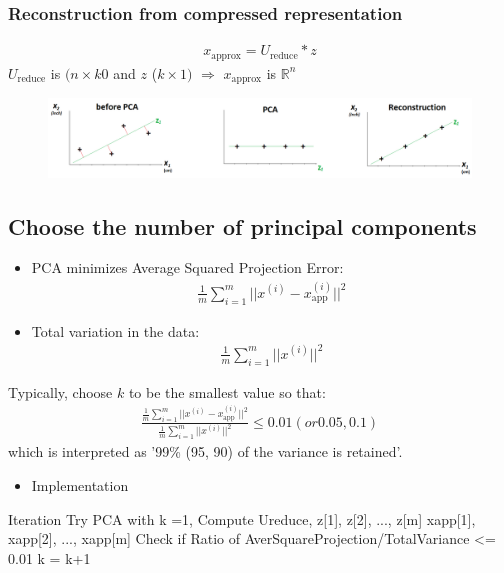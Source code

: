\documentclass[a4paper,12pt]{report}
\begin{document}
\subsubsection{Reconstruction from compressed representation}
\begin{align}
x_{\text{approx}} = U_{\text{reduce}} * z
\end{align}
$U_{\text{reduce}}$ is $(n \times k0$ and $z$ ($k \times 1)$ $\Rightarrow$ $x_{\text{approx}}$ is $\mathbb{R}^n$ 
\begin{figure}[H]
	\centering
        \includegraphics[totalheight=3 cm]{fig8.png}\caption{}
\end{figure}

\subsection{Choose the number of principal components}
\begin{itemize}
\item PCA minimizes Average Squared Projection Error:\\
\begin{align}
\frac{1}{m} \sum _{i=1} ^m || x^{(i)} - x_{\text{app}}^{(i)}||^2
\end{align}
\item Total variation in the data:\\
\begin{align}
\frac{1}{m} \sum _{i=1} ^m || x^{(i)} ||^2
\end{align}
\end{itemize}
Typically, choose $k$ to be the smallest value so that:
\begin{align}
\frac{\frac{1}{m} \sum _{i=1} ^m || x^{(i)} - x_{\text{app}}^{(i)}||^2}{\frac{1}{m} \sum _{i=1} ^m || x^{(i)} ||^2
} \leq 0.01 (or 0.05, 0.1)
\end{align}
which is interpreted as '99\% (95, 90) of the variance is retained'.
\begin{itemize}
\item Implementation
\end{itemize}
\begin{tcolorbox}
\begin{python}
Iteration
	Try PCA with k =1,
		Compute Ureduce, z[1], z[2], ..., z[m]
		                 xapp[1], xapp[2], ..., xapp[m]
		Check if Ratio of AverSquareProjection/TotalVariance <= 0.01
		k = k+1
\end{python}
\end{tcolorbox}
\end{document}

